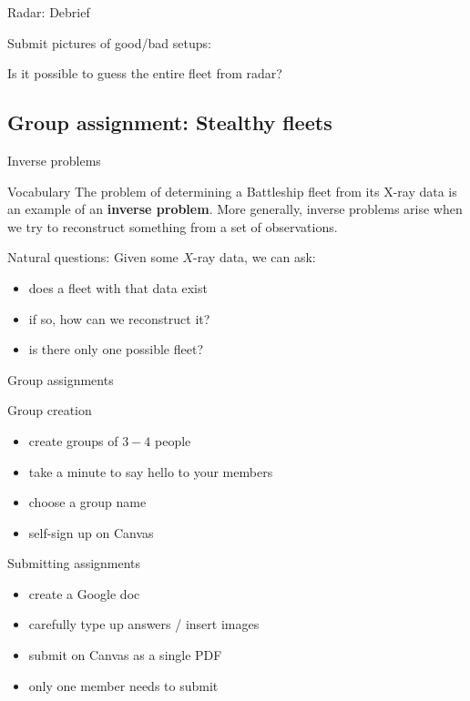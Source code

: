 \documentclass{beamer}
\begin{document}
\begin{frame}{Radar: Debrief}
\pause
  \begin{block}{Submit pictures of good/bad setups:}
    \begin{center}
    \end{center}
  \end{block}
\pause
  \begin{center}
    Is it possible to guess the entire fleet from radar?
  \end{center}
\end{frame}

\subsection{Group assignment: Stealthy fleets}

\begin{frame}{Inverse problems}
  \begin{block}{Vocabulary}
	The problem of determining a Battleship fleet from its X-ray data is an
	example of an \textbf{inverse problem}.  More generally, inverse problems
    arise when we try to reconstruct something from a set of observations.
  \end{block}
  \begin{block}{Natural questions:}
    Given some $X$-ray data, we can ask:
    \begin{itemize}
      \item does a fleet with that data exist
      \item if so, how can we reconstruct it?
      \item is there only one possible fleet?
    \end{itemize}
  \end{block}
\end{frame}

\begin{frame}{Group assignments}
\begin{block}{Group creation}
  \begin{itemize}
    \item create groups of $3-4$ people
    \item take a minute to say hello to your members
    \item choose a group name
    \item self-sign up on Canvas
  \end{itemize}
  \end{block}
\begin{block}{Submitting assignments}
  \begin{itemize}
    \item create a Google doc
    \item carefully type up answers / insert images
    \item submit on Canvas as a single PDF
    \item only one member needs to submit
  \end{itemize}
  \end{block}
\end{frame}
\end{document}
